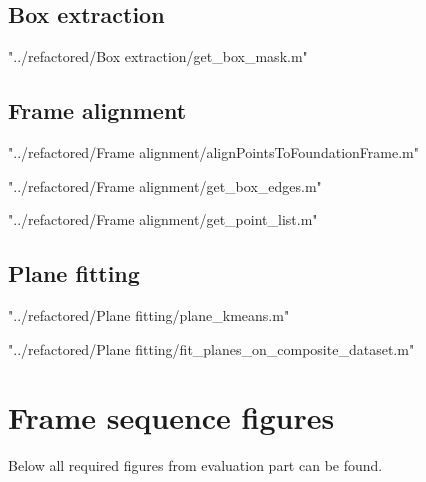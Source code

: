 \documentclass[12pt,a4paper,onecolumn]{article}
\begin{document}
\subsection{Box extraction}

{"../refactored/Box extraction/get_box_mask.m"}

\subsection{Frame alignment}

{"../refactored/Frame alignment/alignPointsToFoundationFrame.m"}

{"../refactored/Frame alignment/get_box_edges.m"}

{"../refactored/Frame alignment/get_point_list.m"}

\subsection{Plane fitting}

{"../refactored/Plane fitting/plane_kmeans.m"}

{"../refactored/Plane fitting/fit_planes_on_composite_dataset.m"}




\section{Frame sequence figures}
Below all required figures from evaluation part can be found.
\end{document}

